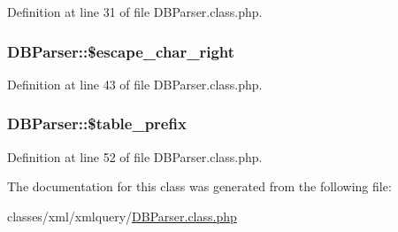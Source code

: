 Definition at line 31 of file D\-B\-Parser.\-class.\-php.

\hypertarget{classDBParser_acb291f115d0e864a5a5774ebcf091eeb}{
\subsubsection[{\$escape\-\_\-char\-\_\-right}]{\setlength{\rightskip}{0pt plus 5cm}D\-B\-Parser\-::\$escape\-\_\-char\-\_\-right}}\label{classDBParser_acb291f115d0e864a5a5774ebcf091eeb}


Definition at line 43 of file D\-B\-Parser.\-class.\-php.

\hypertarget{classDBParser_aecad815ff642d9c918e97747d638dbf0}{
\subsubsection[{\$table\-\_\-prefix}]{\setlength{\rightskip}{0pt plus 5cm}D\-B\-Parser\-::\$table\-\_\-prefix}}\label{classDBParser_aecad815ff642d9c918e97747d638dbf0}


Definition at line 52 of file D\-B\-Parser.\-class.\-php.



The documentation for this class was generated from the following file\-:\begin{DoxyCompactItemize}
\item 
classes/xml/xmlquery/\hyperlink{DBParser_8class_8php}{D\-B\-Parser.\-class.\-php}\end{DoxyCompactItemize}
